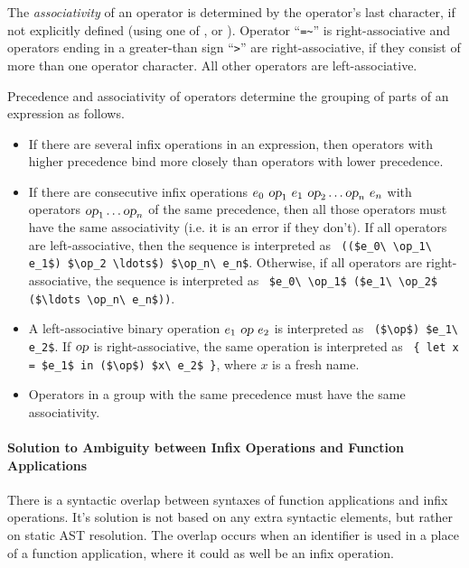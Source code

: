 The {\em associativity} of an operator is determined by the operator's last character, if not explicitly defined (using one of ,  or ). Operator ``\lstinline!=~!'' is right-associative and operators ending in a greater-than sign ``\lstinline!>!'' are right-associative, if they consist of more than one operator character. All other operators are left-associative. 

Precedence and associativity of operators determine the grouping of parts of an expression as follows.

\begin{itemize}
  \item If there are several infix operations in an expression, then operators with higher precedence bind more closely than operators with lower precedence. 
  
  \item If there are consecutive infix operations $e_0\ \mbox{\sl op}_1\ e_1\ \mbox{\sl op}_2 \ldots \mbox{\sl op}_n\ e_n$ with operators $\mbox{\sl op}_1 \ldots \mbox{\sl op}_n$ of the same precedence, then all those operators must have the same associativity (i.e. it is an error if they don't). If all operators are left-associative, then the sequence is interpreted as ~\lstinline!(($e_0\ \op_1\ e_1$) $\op_2 \ldots$) $\op_n\ e_n$!. Otherwise, if all operators are right-associative, the sequence is interpreted as ~\lstinline!$e_0\ \op_1$ ($e_1\ \op_2$ ($\ldots \op_n\ e_n$))!.

  \item A left-associative binary operation $e_1\ \mbox{\sl op}\ e_2$ is interpreted as ~\lstinline!($\op$) $e_1\ e_2$!. If $\mbox{\sl op}$ is right-associative, the same operation is interpreted as ~\lstinline!{ let x = $e_1$ in ($\op$) $x\ e_2$ }!, where $x$ is a fresh name. 

  \item Operators in a group with the same precedence must have the same associativity. 

\end{itemize}





\paragraph{Solution to Ambiguity between Infix Operations and Function Applications}

There is a syntactic overlap between syntaxes of function applications and infix operations. It's solution is not based on any extra syntactic elements, but rather on static AST resolution. The overlap occurs when an identifier is used in a place of a function application, where it could as well be an infix operation. 

